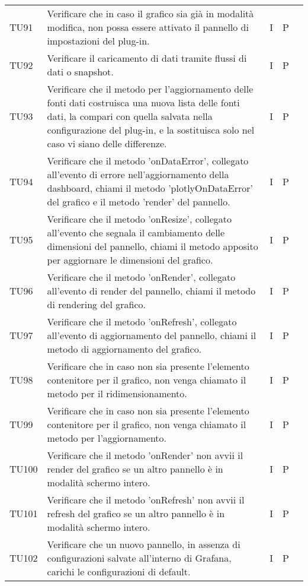 \begin{longtable} {
		>{}p{15mm} 
		>{}p{79.5mm}
		>{}p{15mm} 
		>{}p{15mm}
		>{}p{0mm}}
	TU91		& Verificare che in caso il grafico sia già in modalità modifica, non possa essere attivato il pannello di impostazioni del plug-in.& I & P &\TBstrut \\ [2mm]
	TU92		& Verificare il caricamento di dati tramite flussi di dati o snapshot.& I & P &\TBstrut \\ [2mm]
	TU93		& Verificare che il metodo per l'aggiornamento delle fonti dati costruisca una nuova lista delle fonti dati, la compari con quella salvata nella configurazione del plug-in, e la sostituisca solo nel caso vi siano delle differenze. & I & P &\TBstrut \\ [2mm]
	TU94		& Verificare che il metodo 'onDataError', collegato all'evento di errore nell'aggiornamento della dashboard, chiami il metodo 'plotlyOnDataError' del grafico e il metodo 'render' del pannello.& I & P &\TBstrut \\ [2mm]
	TU95		& Verificare che il metodo 'onResize', collegato all'evento che segnala il cambiamento delle dimensioni del pannello, chiami il metodo apposito per aggiornare le dimensioni del grafico.& I & P &\TBstrut \\ [2mm]
	TU96		& Verificare che il metodo 'onRender', collegato all'evento di render del pannello, chiami il metodo di rendering del grafico.& I & P &\TBstrut \\ [2mm]
	TU97		& Verificare che il metodo 'onRefresh', collegato all'evento di aggiornamento del pannello, chiami il metodo di aggiornamento del grafico.& I & P &\TBstrut \\ [2mm]
	TU98		& Verificare che in caso non sia presente l'elemento contenitore per il grafico, non venga chiamato il metodo per il ridimensionamento.& I & P &\TBstrut \\ [2mm]
	TU99		& Verificare che in caso non sia presente l'elemento contenitore per il grafico, non venga chiamato il metodo per l'aggiornamento.& I & P &\TBstrut \\ [2mm]
	TU100		& Verificare che il metodo 'onRender' non avvii il render del grafico se un altro pannello è in modalità schermo intero.& I & P &\TBstrut \\ [2mm]
	TU101		& Verificare che il metodo 'onRefresh' non avvii il refresh del grafico se un altro pannello è in modalità schermo intero.& I & P &\TBstrut \\ [2mm]
	TU102		& Verificare che un nuovo pannello, in assenza di configurazioni salvate all'interno di Grafana, carichi le configurazioni di default.& I & P &\TBstrut \\ [2mm]

\end{longtable}
